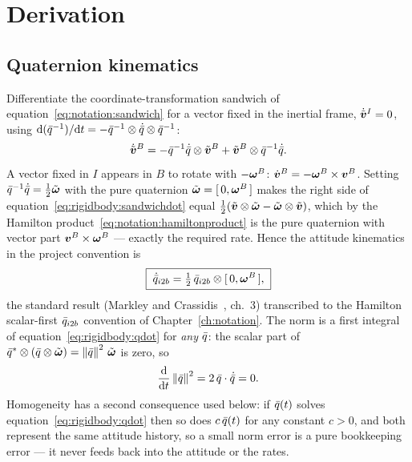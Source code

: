 \section{Derivation}
\label{sec:rigidbody:derivation}

\subsection{Quaternion kinematics}

Differentiate the coordinate-transformation sandwich of
equation~\eqref{eq:notation:sandwich} for a vector fixed in the inertial
frame, $\dot{\tilde{\bm{v}}}^{I} = 0$, using
$\mathrm{d}(\bar{q}^{-1})/\mathrm{d}t = -\bar{q}^{-1} \otimes
\dot{\bar{q}} \otimes \bar{q}^{-1}$:
\begin{equation}
  \dot{\tilde{\bm{v}}}^{B}
    = -\bar{q}^{-1} \dot{\bar{q}} \otimes \tilde{\bm{v}}^{B}
      + \tilde{\bm{v}}^{B} \otimes \bar{q}^{-1} \dot{\bar{q}} .
  \label{eq:rigidbody:sandwichdot}
\end{equation}
A vector fixed in $I$ appears in $B$ to rotate with
$-\bm{\omega}^{B}$: $\dot{\bm{v}}^{B} = -\bm{\omega}^{B} \times
\bm{v}^{B}$. Setting $\bar{q}^{-1} \dot{\bar{q}} =
\tfrac{1}{2}\tilde{\bm{\omega}}$ with the pure quaternion
$\tilde{\bm{\omega}} = [\,0, \bm{\omega}^{B}\,]$ makes the right side of
equation~\eqref{eq:rigidbody:sandwichdot} equal
$\tfrac{1}{2}(\tilde{\bm{v}} \otimes \tilde{\bm{\omega}} -
\tilde{\bm{\omega}} \otimes \tilde{\bm{v}})$, which by the Hamilton
product~\eqref{eq:notation:hamiltonproduct} is the pure quaternion with
vector part $\bm{v}^{B} \times \bm{\omega}^{B}$ --- exactly the required
rate. Hence the attitude kinematics in the project convention is
\begin{equation}
  \boxed{\;
  \dot{\bar{q}}_{i2b}
    = \tfrac{1}{2}\, \bar{q}_{i2b} \otimes
      [\,0, \bm{\omega}^{B}\,] ,
  \;}
  \label{eq:rigidbody:qdot}
\end{equation}
the standard result (Markley and Crassidis~\cite{markley2014}, ch.~3)
transcribed to the Hamilton scalar-first $\bar{q}_{i2b}$ convention of
Chapter~\ref{ch:notation}. The norm is a first integral of
equation~\eqref{eq:rigidbody:qdot} for \emph{any} $\bar{q}$: the scalar
part of $\bar{q}^{*} \otimes (\bar{q} \otimes \tilde{\bm{\omega}}) =
\left\lVert \bar{q} \right\rVert^{2}\, \tilde{\bm{\omega}}$ is zero, so
\begin{equation}
  \frac{\mathrm{d}}{\mathrm{d}t} \left\lVert \bar{q} \right\rVert^{2}
    = 2\, \bar{q} \cdot \dot{\bar{q}} = 0 .
  \label{eq:rigidbody:qnorm}
\end{equation}
Homogeneity has a second consequence used below: if $\bar{q}(t)$ solves
equation~\eqref{eq:rigidbody:qdot} then so does $c\,\bar{q}(t)$ for any
constant $c > 0$, and both represent the same attitude history, so a small
norm error is a pure bookkeeping error --- it never feeds back into the
attitude or the rates.

